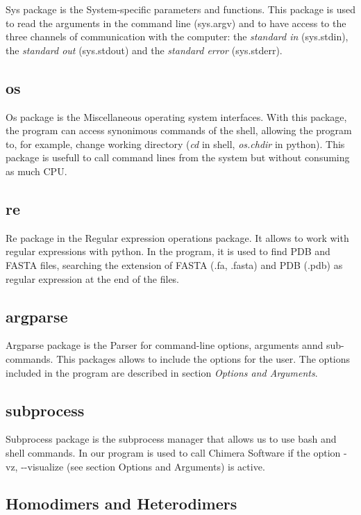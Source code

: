 \documentclass[a4paper,12pt]{report}
\begin{document}
Sys package is the System-specific parameters and functions. This package is used to read the arguments in the command line (sys.argv) and to have access to the three channels of communication with the computer: the \textit{standard in} (sys.stdin), the \textit{standard out} (sys.stdout) and the \textit{standard error} (sys.stderr).

\subsection{os}

Os package is the Miscellaneous operating system interfaces. With this package, the program can access synonimous commands of the shell, allowing the program to, for example, change working directory (\textit{cd} in shell, \textit{os.chdir} in python). 
This package is usefull to call command lines from the system but without consuming as much CPU.

\subsection{re}

Re package in the Regular expression operations package. It allows to work with regular expressions with python. In the program, it is used to find PDB and FASTA files, searching the extension of FASTA (.fa, .fasta) and PDB (.pdb) as regular expression at the end of the files.


\subsection{argparse}

Argparse package is the Parser for command-line options, arguments annd sub-commands. This packages allows to include the options for the user. The options included in the program are described in section \textit{Options and Arguments}.

\subsection{subprocess}

Subprocess package is the subprocess manager that allows us to use bash and shell commands. In our program is used to call Chimera Software if the option -vz, -{}-visualize (see section Options and Arguments) is active.

\subsection{Homodimers and Heterodimers}
\end{document}
